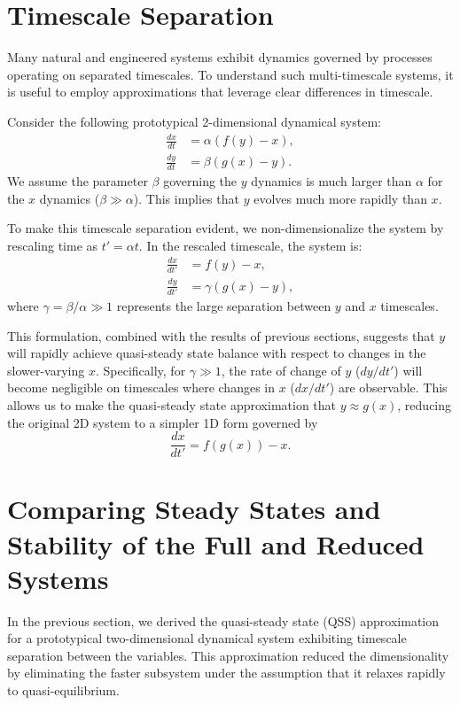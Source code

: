 \section{Timescale Separation}

Many natural and engineered systems exhibit dynamics governed by processes operating on separated timescales. To understand such multi-timescale systems, it is useful to employ approximations that leverage clear differences in timescale.

Consider the following prototypical 2-dimensional dynamical system:
\begin{align*}
\frac{dx}{dt} & = \alpha(f(y) - x),\\
\frac{dy}{dt} & = \beta(g(x) - y).
\end{align*}
We assume the parameter $\beta$ governing the $y$ dynamics is much larger than $\alpha$ for the $x$ dynamics ($\beta \gg \alpha$). This implies that $y$ evolves much more rapidly than $x$.

To make this timescale separation evident, we non-dimensionalize the system by rescaling time as $t' = \alpha t$. In the rescaled timescale, the system is:
\begin{align}
\frac{dx}{dt'} & = f(y) - x, \label{eq:21.03}\\
\frac{dy}{dt'} & = \gamma(g(x) - y), \label{eq:21.04}
\end{align}
where $\gamma = \beta/\alpha \gg 1$ represents the large separation between $y$ and $x$ timescales.

This formulation, combined with the results of previous sections, suggests that $y$ will rapidly achieve quasi-steady state balance with respect to changes in the slower-varying $x$. Specifically, for $\gamma \gg 1$, the rate of change of $y$ ($dy/dt'$) will become negligible on timescales where changes in $x$ ($dx/dt'$) are observable. This allows us to make the quasi-steady state approximation that $y \approx g(x)$, reducing the original 2D system to a simpler 1D form governed by 
\begin{equation}
    \frac{dx}{dt'} = f(g(x)) - x. \label{eq:21.05}
\end{equation}

\section{Comparing Steady States and Stability of the Full and Reduced Systems}

In the previous section, we derived the quasi-steady state (QSS) approximation for a prototypical two-dimensional dynamical system exhibiting timescale separation between the variables. This approximation reduced the dimensionality by eliminating the faster subsystem under the assumption that it relaxes rapidly to quasi-equilibrium.

